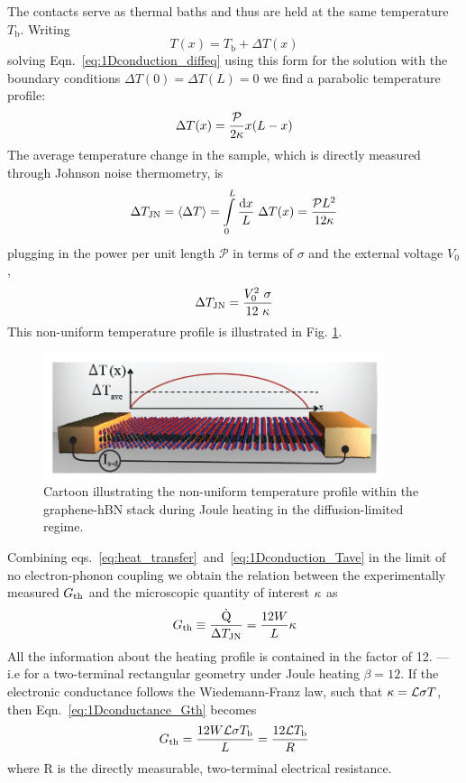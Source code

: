 The contacts serve as thermal baths and thus are held at the same temperature $T_\mathrm{b}$. Writing 
\begin{equation}
T(x) = T_\mathrm{b} + \Delta T(x)
\end{equation}
solving Eqn.~\ref{eq:1Dconduction_diffeq} using this form for the solution with the boundary conditions $\Delta T(0) = \Delta T(L) = 0$ we find a parabolic temperature profile:
\begin{equation}
\Delta T(x) = \frac{\mathcal{P}}{2\mathrm{\kappa}}x(L-x) 
\end{equation}
The average temperature change in the sample, which is directly measured through Johnson noise thermometry, is 
\begin{equation}\label{eq:1Dconduction_Tave}
\Delta T_{\mathrm{JN}} = \langle\Delta T\rangle = \int\limits_0^L \frac{\mathrm{d}x}{L}\; \Delta T(x)  = \frac{\mathcal{P}L^2}{12\mathrm{\kappa}}
\end{equation}
plugging in the power per unit length $\mathcal{P}$ in terms of $\sigma$ and the external voltage $V_0$,
\begin{equation}
\Delta T_{\mathrm{JN}} = \frac{V_0^2~\sigma}{12~\mathrm{\kappa}}
\end{equation}
This non-uniform temperature profile is illustrated in Fig. \ref{fig:cartoon_Tprofile}.   
\begin{figure}
\centering
\includegraphics[width=100mm]{figures/thermal_via_noise/picture_temperature_profile.png}
\caption{Cartoon illustrating the non-uniform temperature profile within the graphene-hBN stack during Joule heating in the diffusion-limited regime.}
\label{fig:cartoon_Tprofile}
\end{figure}

Combining eqs.~\ref{eq:heat_transfer}~and~\ref{eq:1Dconduction_Tave} in the limit of no electron-phonon coupling we obtain the relation between the experimentally measured $G_{\mathrm{th}}$ and the microscopic quantity of interest $\mathrm{\kappa}$ as
\begin{equation}\label{eq:1Dconductance_Gth}
G_{\mathrm{th}} \equiv \frac{\dot{\mathrm{Q}}}{\Delta T_{\mathrm{JN}}} = \frac{12W}{L} \mathrm{\kappa}
\end{equation}
All the information about the heating profile is contained in the factor of 12. --- i.e for a two-terminal rectangular geometry under Joule heating $\beta = 12$. If the electronic conductance follows the Wiedemann-Franz law, such that $\mathrm{\kappa}=\mathcal{L}\sigma T$, then Eqn.~\ref{eq:1Dconductance_Gth} becomes
\begin{equation}\label{eq:1Dconductance_GthWF}
G_{\mathrm{th}} = \frac{12W\mathcal{L}\sigma T_\mathrm{b}}{L} = \frac{12\mathcal{L} T_\mathrm{b}}{R}
\end{equation}
where R is the directly measurable, two-terminal electrical resistance.

